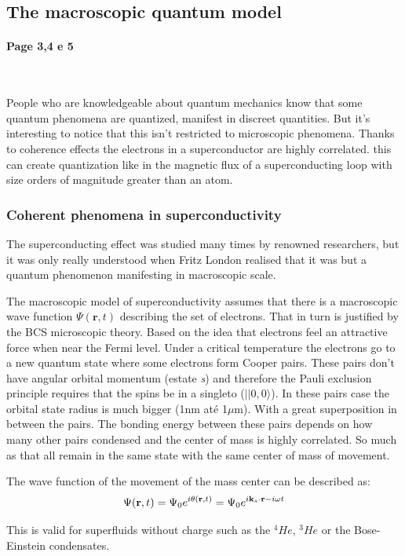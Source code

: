 \documentclass[12pt]{article}
\numberwithin{equation}{subsection}
\newcommand\page[1]{
{
\color{blue}\paragraph{
Page #1
}\mbox{}\\
}
}
\begin{document}
\subsection{The macroscopic quantum model}
\page{3,4 e 5}

People who are knowledgeable about quantum mechanics know that some quantum phenomena are quantized, manifest in discreet quantities. But it's interesting to notice that this isn't restricted to microscopic phenomena. Thanks to coherence effects the electrons in a superconductor are highly correlated. this can create quantization like in the magnetic flux of a superconducting loop with size orders of magnitude greater than an atom.



\subsubsection{Coherent phenomena in superconductivity}
The superconducting effect was studied many times by renowned researchers, but it was only really understood when Fritz London realised that it was but a quantum phenomenon manifesting in macroscopic scale. 

The macroscopic model of superconductivity assumes that there is a macroscopic wave function $\Psi(\textbf{r},t)$ describing the set of electrons. That in turn is justified by the BCS microscopic theory. Based on the idea that electrons feel an attractive force when near the Fermi level. Under a critical temperature the electrons go to a new quantum state where some electrons form Cooper pairs. These pairs don't have angular orbital momentum (estate \emph{s}) and therefore the Pauli exclusion principle requires that the spins be in a singleto ($||0,0\rangle$). In these pairs case the orbital state radius is much bigger (1nm até 1$\mu$m). With a great superposition in between the pairs. The bonding energy between these pairs depends on how many other pairs condensed and the center of mass is highly correlated. So much as that all remain in the same state with the same center of mass of movement.


The wave function of the movement of the mass center can be described as:
\begin{equation}
\Psi (\textbf{r} ,t)= \Psi_0 e^{i\theta(\textbf r,t)}= \Psi_0 e^{i\textbf{k}_s\cdot \textbf{r}-i\omega t } 
\end{equation}

This is valid for superfluids without charge such as the $^4He$, $^3He$ or the Bose-Einstein condensates.
\end{document}
